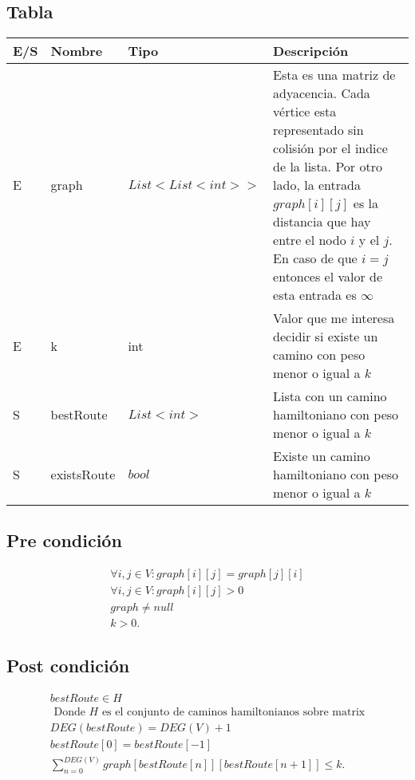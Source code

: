 \documentclass{report}
\begin{document}
\section{}

\subsection{Tabla}

\noindent \begin{tabularx}{\textwidth}{@{} l X X X @{}}
\toprule
\textbf{E/S} & \textbf{Nombre} & \textbf{Tipo} & \textbf{Descripción} \\
\midrule
E
& graph
& $List<List<int>>$
& Esta es una matriz de adyacencia. Cada vértice esta representado sin colisión por el indice de la lista. Por otro lado, la entrada $graph[i][j]$ es la distancia que hay entre el nodo $i$ y el $j$. En caso de que $i = j$ entonces el valor de esta entrada es  $\infty$ \\
E
& k
& int
& Valor que me interesa decidir si existe un camino con peso menor o igual a $k$\\
S
& bestRoute
& $List<int>$
& Lista con un camino hamiltoniano con peso menor o igual a $k$\\
S
& existsRoute
& $bool$
& Existe un camino hamiltoniano con peso menor o igual a  $k$\\
\bottomrule
\end{tabularx}

\subsection{Pre condición}
\begin{align*}
  \forall i, j \in V: graph[i][j] = graph[j][i]\\
  \forall i, j \in V: graph[i][j] >  0\\
  graph \neq null\\
  k > 0
.\end{align*}

\subsection{Post condición}

\begin{align*}
  bestRoute \in H\\ \text{ Donde }H\text{ es el conjunto de caminos hamiltonianos sobre matrix}\\
  DEG(bestRoute) = DEG(V) + 1\\
  bestRoute[0] = bestRoute[-1]\\
  \sum_{n=0}^{DEG(V)} graph[bestRoute[n]][bestRoute[n + 1]] \le k
.\end{align*}
\end{document}
